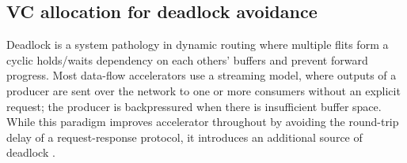 
\subsection{VC allocation for deadlock avoidance} \label{sec:vc}
Deadlock is a system pathology in dynamic routing where multiple flits form a cyclic holds/waits dependency on each others' buffers and prevent forward progress.
Most data-flow accelerators use a streaming model, where outputs of a producer are sent over the network to one or more consumers
without an explicit request; the producer is backpressured when there is insufficient buffer space. 
While this paradigm improves accelerator throughout by avoiding the round-trip delay of a request-response protocol, it introduces an additional source of deadlock \cite{hansson2007avoiding}. 

